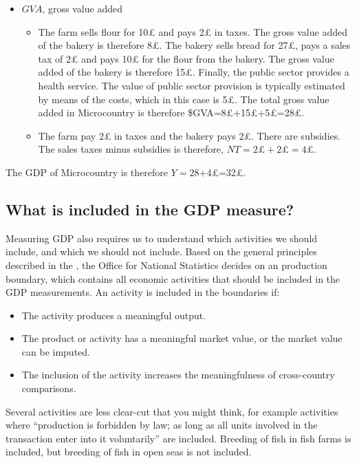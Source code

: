 \documentclass[]{book}
\providecommand{\tightlist}{%
  \setlength{\itemsep}{0pt}\setlength{\parskip}{0pt}}
\begin{document}
\begin{itemize}
\item
  \(GVA\), gross value added

  \begin{itemize}
  \item
    The farm sells flour for 10£ and pays 2£ in taxes. The gross value added of the bakery is therefore 8£. The bakery sells bread for 27£, pays a sales tax of 2£ and pays 10£ for the flour from the bakery. The gross value added of the bakery is therefore 15£. Finally, the public sector provides a health service. The value of public sector provision is typically estimated by means of the costs, which in this case is 5£. The total gross value added in Microcountry is therefore \$GVA=8£+15£+5£=28£.
  \item
    The farm pay 2£ in taxes and the bakery pays 2£. There are subsidies. The sales taxes minus subsidies is therefore, \(NT=2£+2£=4£\).
  \end{itemize}
\end{itemize}

The GDP of Microcountry is therefore \(Y=28\)+4£=32£.

\hypertarget{what-is-included-in-the-gdp-measure}{%
\subsection{What is included in the GDP measure?}\label{what-is-included-in-the-gdp-measure}}

Measuring GDP also requires us to understand which activities we should include, and which we should not include. Based on the general principles described in the \citep{esa2010}, the Office for National Statistics decides on an production boundary, which contains all economic activities that should be included in the GDP measurements. An activity is included in the boundaries if:

\begin{itemize}
\tightlist
\item
  The activity produces a meaningful output.
\item
  The product or activity has a meaningful market value, or the market value can be imputed.
\item
  The inclusion of the activity increases the meaningfulness of cross-country comparisons.
\end{itemize}

Several activities are less clear-cut that you might think, for example activities where ``production is forbidden by law; as long as all units involved in the transaction enter into it voluntarily'' are included. Breeding of fish in fish farms is included, but breeding of fish in open seas is not included.
\end{document}

